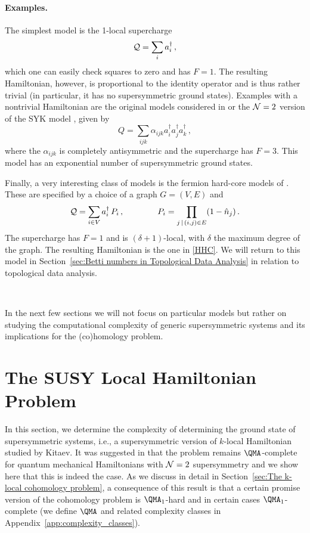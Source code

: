 \documentclass[11pt]{article}
\numberwithin{equation}{section}
\def\cN{{\cal N}}
\def\cQ{{\cal Q}}
\newcommand\equ[1] {\begin{equation}#1\end{equation}}
\renewcommand\( {\left(}
\renewcommand\) {\right)}
\begin{document}
\paragraph{Examples.} 

The simplest model is  the 1-local supercharge
\equ{
\cQ=\sum_{i}a_{i}^{\dagger}\,,
}
which one can easily check squares to zero and has $F=1$. The resulting Hamiltonian, however, is proportional to the identity operator and is thus rather trivial (in particular, it has no supersymmetric ground states). Examples with a nontrivial Hamiltonian are the original models considered in \cite{Nicolai:1976xp} or the $\cN=2$ version of the SYK model \cite{Fu:2016vas}, given by
\equ{
Q=\sum_{ijk} \alpha_{ijk}a^{\dagger}_{i}a^{\dagger}_{j}a^{\dagger}_{k}\,,
}
where the $\alpha_{ijk}$ is completely antisymmetric and the supercharge has $F=3$. This model has an exponential number of supersymmetric ground states.  

Finally, a very interesting class of models is the fermion hard-core models of \cite{Fendley:2002sg}. These are specified by a choice of a graph $G=(V,E)$ and  
\equ{
\cQ=\sum_{i\in V}a_{i}^{\dagger}\, P_{i}\,,\qquad \qquad P_{i}= \prod_{j\,|\,(i,j)\in E  }(1-\hat n_{j}) \,.
}
The supercharge has $F=1$ and is $(\delta+1)$-local, with $\delta$ the maximum degree of the graph. The resulting Hamiltonian is the one in \eqref{HHC}. We will return to this model in Section~\ref{sec:Betti numbers in Topological Data Analysis} in relation to topological data analysis.

\

In the next few sections we will not focus on particular models but rather on studying the computational complexity of generic supersymmetric systems and its implications for the (co)homology problem.

\section{The SUSY Local Hamiltonian Problem}
\label{sec:The SUSY local Hamiltonian problem}

In this section, we determine the complexity of determining the ground state of supersymmetric systems, i.e., a supersymmetric version of  {\sc $k$-local Hamiltonian} studied by Kitaev.  It was suggested in \cite{Crichigno:2020vue} that the problem remains  $\QMA$-complete for quantum mechanical Hamiltonians with $\cN=2$ supersymmetry and we show here that this is indeed the case.  As we discuss in detail in Section~\ref{sec:The k-local cohomology problem}, a  consequence of this result is that a certain promise version of the cohomology problem is $\QMA_{1}$-hard and in certain cases $\QMA_{1}$-complete (we define $\QMA$ and related complexity classes in Appendix~\ref{app:complexity_classes}). 
\end{document}
